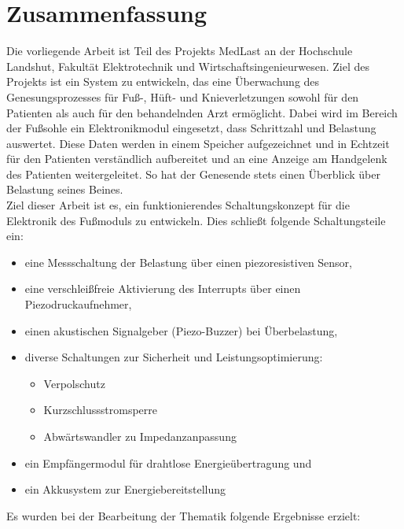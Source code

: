 \documentclass[12pt]{scrreprt} %
\begin{document}
\chapter*{Zusammenfassung}
Die vorliegende Arbeit ist Teil des Projekts MedLast an der Hochschule Landshut, Fakultät Elektrotechnik und Wirtschaftsingenieurwesen. Ziel des Projekts ist ein System zu entwickeln, das eine Überwachung des Genesungsprozesses für Fuß-, Hüft- und Knieverletzungen sowohl für den Patienten als auch für den behandelnden Arzt ermöglicht. Dabei wird im Bereich der Fußsohle ein Elektronikmodul eingesetzt, dass Schrittzahl und Belastung auswertet. Diese Daten werden in einem Speicher aufgezeichnet und in Echtzeit für den Patienten verständlich aufbereitet und an eine Anzeige am Handgelenk des Patienten weitergeleitet. So hat der Genesende stets einen Überblick über Belastung seines Beines.\\
Ziel dieser Arbeit ist es, ein funktionierendes Schaltungskonzept für die Elektronik des Fußmoduls zu entwickeln. Dies schließt folgende Schaltungsteile ein:
\begin{itemize}
\item
eine Messschaltung der Belastung über einen piezoresistiven Sensor,
\item
eine verschleißfreie Aktivierung des Interrupts über einen Piezodruckaufnehmer,
\item
einen akustischen Signalgeber (Piezo-Buzzer) bei Überbelastung, 
\item
diverse Schaltungen zur Sicherheit und Leistungsoptimierung:
\begin{itemize}
\item
Verpolschutz
\item
Kurzschlussstromsperre
\item
Abwärtswandler zu Impedanzanpassung
\end{itemize}
\item
ein Empfängermodul für drahtlose Energieübertragung und 
\item
ein Akkusystem zur Energiebereitstellung 
\end{itemize}
\newpage
Es wurden bei der Bearbeitung der Thematik folgende Ergebnisse erzielt:
\end{document}
